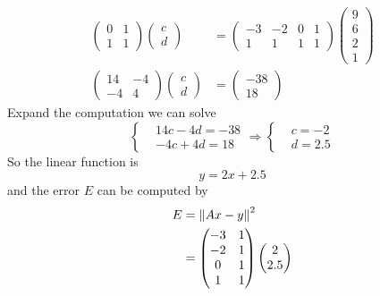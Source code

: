 \begin{homeworkProblem}
\begin{enumerate}[label=(\roman*)]
\[\begin{aligned}
\begin{pmatrix}
            0 & 1 \\
            1 & 1
        \end{pmatrix} \begin{pmatrix} c \\ d\end{pmatrix} &= \begin{pmatrix}
            -3 & -2 & 0 & 1\\
            1 & 1 & 1 & 1
        \end{pmatrix} \begin{pmatrix}
            9 \\ 6 \\ 2 \\ 1
        \end{pmatrix}\\
        \begin{pmatrix}
            14 & -4 \\
            -4 & 4
        \end{pmatrix}\begin{pmatrix}
            c \\ d
        \end{pmatrix} &= \begin{pmatrix}
            -38 \\ 18
        \end{pmatrix}
    \end{aligned}
    \]
    Expand the computation we can solve \[
    \left\{
    \begin{aligned}
    &14c - 4d = -38 \\
    &-4c + 4d = 18
    \end{aligned}
    \right.
    \Longrightarrow
    \left\{
    \begin{aligned}
    &c = -2\\
    &d = 2.5
    \end{aligned}
    \right.
    \]
    So the linear function is \[
        y = 2x + 2.5
    \]
    and the error $E$ can be computed by
    \[
    \begin{aligned}
        E &= \left\lVert Ax-y \right\rVert^2 \\
        &= \begin{pmatrix}
            -3 & 1 \\
            -2 & 1 \\
            0 & 1 \\
            1 & 1
        \end{pmatrix} \begin{pmatrix}
            2 \\ 2.5

\end{pmatrix}
\end{aligned}\]
\end{enumerate}
\end{homeworkProblem}
